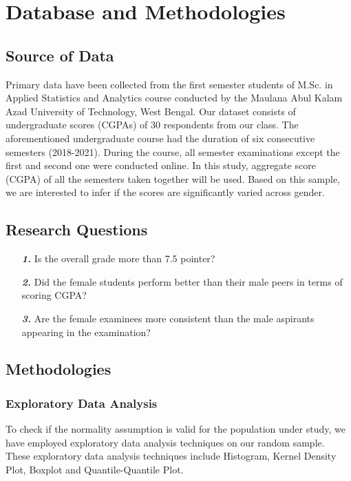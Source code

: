 \documentclass[12pt,a4paper]{report}
\begin{document}
\section{Database and Methodologies}
\subsection{Source of Data}
\justifying
\Large{Primary data have been collected from the first semester students of M.Sc. in Applied Statistics and Analytics course conducted by the Maulana Abul Kalam Azad University of Technology, West Bengal. Our dataset consists of undergraduate scores (CGPAs) of 30 respondents from our class. The aforementioned undergraduate course had the duration of six consecutive semesters (2018-2021). During the course, all semester examinations except the first and second one were conducted online. In this study, aggregate score (CGPA) of all the semesters taken together will be used. Based on this sample, we are interested to infer if the scores are significantly varied across gender.}
\subsection{Research Questions}
\justifying
\begin{enumerate}
   \item[\Large{\textbf{\textit{1.}}}]
   \Large{Is the overall grade more than 7.5 pointer?}
   \item[\Large{\textbf{\textit{2.}}}]
   \Large{Did the female students perform better than their male peers in terms of scoring \large{CGPA}?}
   \item[\Large{\textbf{\textit{3.}}}]
   \Large{Are the female examinees more consistent than the male aspirants appearing in the examination?}
\end{enumerate}
\subsection{Methodologies}
\justifying
\subsubsection{\large{Exploratory Data Analysis}}
\Large{To check if the normality assumption is valid for the population under study, we have employed exploratory data analysis techniques on our random sample. These exploratory data analysis techniques include Histogram, Kernel Density Plot, Boxplot and Quantile-Quantile Plot.}
\vspace{-30pt}
\end{document}
